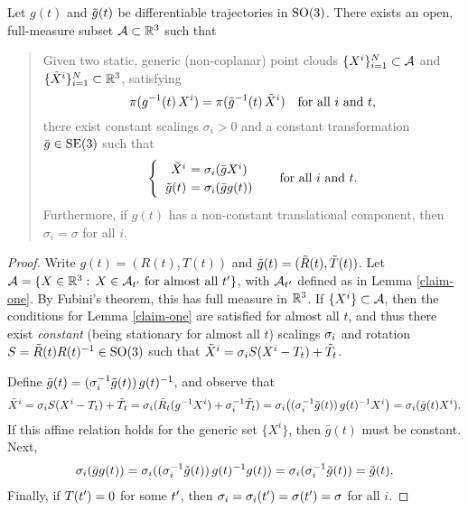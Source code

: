 \iffalse
\begin{claim}\label{claim-one}
Let $X^i(t) \in \real^3, i = 1, \dots, N(t); t\in {\mathbb Z}$ and $\Xw^i(t) \neq X^i(t)$. Then $\pi(X^i(t)) = \pi(\Xw^i(t))$ if and only if $\Xw^i(t) = \sigma(t) X^i(t) \ \forall \ i, t$, where $\sigma(t) > 0$ is an arbitrary positive scalar-valued function of $t$ (and $i$).
\end{claim}
This follows directly from the definition of the projection map $\pi$.
\fi

\begin{claim}\label{claim-two}
Let $g(t)$ and $\tilde{g}(t)$ be differentiable trajectories in $\operatorname{SO}(3)$.
There exists an open, full-measure subset $\mathcal{A}\subset\mathbb{R}^3$ such that
\begin{quote}
Given two static, generic (non-coplanar) point clouds $\{X^i\}_{i=1}^N\subset\mathcal{A}$ 
and $\{\tilde{X}^i\}_{i=1}^N\subset\mathbb{R}^3$, satisfying
$$\pi(g^{-1}(t)\, X^i) = \pi(\tilde{g}^{-1}(t)\, \tilde{X}^i) \quad \text{for all $i$ and $t$},$$
there exist constant scalings $\sigma_i>0$ and a constant transformation $\bar g\in \operatorname{SE}(3)$ such that
\begin{equation}
\begin{cases}
\begin{tabular}{>{$}r<{$} >{$\!\!\!\!\!}l<{$}}
\Xw^i &= \sit (\bar g X^i) \\
\gw(t) &= \sit (\bar g g(t))
\end{tabular}
\end{cases}
\;\text{for all $i$ and $t$.}
\label{eq-gauge}
\end{equation} 
Furthermore, if $g(t)$ has a non-constant translational component, then $\sigma_i=\sigma$ for all $i$.
\end{quote}
\end{claim}
\begin{proof}
Write $g(t) = (R(t), T(t))$ and $\tilde{g}(t) = (\tilde{R}(t), \tilde{T}(t))$.
Let $\mathcal{A} = \{X\in\mathbb{R}^3:\, X\in\mathcal{A}_{t^{\prime}}\text{ for almost all } t^{\prime}\}$, with $\mathcal{A}_{t^{\prime}}$ defined as in Lemma \ref{claim-one}.  
By Fubini's theorem, this has full measure in $\mathbb{R}^3$.
If $\{X^i\}\subset\mathcal{A}$, then the conditions for
Lemma \ref{claim-one} are satisfied for almost all $t$, and thus
there exist \emph{constant} (being stationary for almost all $t$) scalings $\sigma_{i}$ and rotation 
$S=\tilde{R}(t)R(t)^{-1}\in \operatorname{SO}(3)$ such that
$\tilde{X}^i = \sigma_{i} S(X^i - T_t) + \tilde{T}_t$.

Define $\bar g(t) = (\sigma_{i}^{-1} \tilde{g}(t))\, g(t)^{-1}$, and observe that
\begin{align*}
\tilde{X}^i = \sigma_{i} S(X^i - T_t) + \tilde{T}_t
= \sigma_{i}(\tilde{R}_t(g^{-1} X^i) + \sigma_{i} ^{-1} \tilde{T}_t)
=\sigma_{i} \bigl((\sigma_{i} ^{-1} \tilde{g}(t))\, g(t)^{-1} X^i\bigr)
=\sigma_{i} (\bar g(t) X^i).
\end{align*}
If this affine relation holds for the generic set $\{X^i\}$, then $\bar g(t)$ must be constant.  Next,
\begin{align*}
\sigma_{i} (\bar g g(t)) = \sigma_{i}((\sigma_{i} ^{-1}\tilde{g}(t))\, g(t)^{-1} g(t)) = \sigma_{i}(\sigma_{i} ^{-1}\tilde{g}(t)) = \tilde{g}(t).
\end{align*}
Finally, if $T(t^{\prime})=0$ for some $t^{\prime}$, then $\sigma_{i} = \sigma_{i}(t^{\prime})=\sigma(t^{\prime})=\sigma$
for all $i$.
\end{proof}

